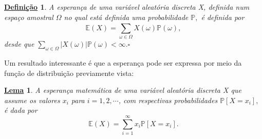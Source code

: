 \documentclass{article}
\newtheorem*{def*}{\underline{Defini\c c\~ao}}
\newtheorem*{lemma*}{\underline{Lema}}
\begin{document}
\begin{def*}
  A esperança de uma variável aleatória discreta X, definida num espaço amostral \(\Omega \) no qual está definida uma
  probabilidade \(\mathbb{P},\) é definida por 
  \[
    \mathbb{E}(X) = \sum\limits_{\omega \in \Omega }^{}X(\omega )\mathbb{P}(\omega ),
  \]
  desde que \(\sum\limits_{\omega \in \Omega }^{}|X(\omega )|\mathbb{P}(\omega ) < \infty. \square\)
\end{def*}
Um resultado interessante é que a esperança pode ser expressa por meio da função de distribuição previamente vista:
\begin{lemma*}
  A esperança matemática de uma variável aleatória discreta X que assume os valores \(x_{i}\) para \(i = 1, 2, \cdots\), com
  respectivas probabilidades \(\mathbb{P}[X=x_{i}],\) é dada por 
  \[
    \mathbb{E}(X) = \sum\limits_{i=1}^{\infty}x_{i}\mathbb{P}[X=x_{i}].
  \]
\end{lemma*}
\end{document}
